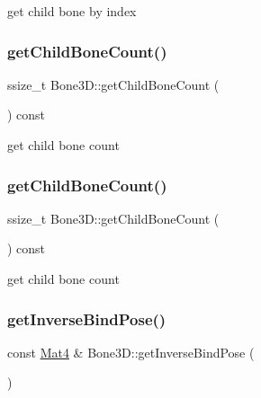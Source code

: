 get child bone by index \mbox{\label{classBone3D_a5538e8f3e7f8af18e7183d673a2041d6}} 
\subsubsection{\texorpdfstring{get\+Child\+Bone\+Count()}{getChildBoneCount()}\hspace{0.1cm}{\footnotesize\ttfamily [1/2]}}
{\footnotesize\ttfamily ssize\+\_\+t Bone3\+D\+::get\+Child\+Bone\+Count (\begin{DoxyParamCaption}{ }\end{DoxyParamCaption}) const}

get child bone count \mbox{\label{classBone3D_a5538e8f3e7f8af18e7183d673a2041d6}} 
\subsubsection{\texorpdfstring{get\+Child\+Bone\+Count()}{getChildBoneCount()}\hspace{0.1cm}{\footnotesize\ttfamily [2/2]}}
{\footnotesize\ttfamily ssize\+\_\+t Bone3\+D\+::get\+Child\+Bone\+Count (\begin{DoxyParamCaption}{ }\end{DoxyParamCaption}) const}

get child bone count \mbox{\label{classBone3D_a399590986c9018faa422b53233860bbf}} 
\subsubsection{\texorpdfstring{get\+Inverse\+Bind\+Pose()}{getInverseBindPose()}\hspace{0.1cm}{\footnotesize\ttfamily [1/2]}}
{\footnotesize\ttfamily const \hyperlink{classMat4}{Mat4} \& Bone3\+D\+::get\+Inverse\+Bind\+Pose (\begin{DoxyParamCaption}{ }\end{DoxyParamCaption})}

